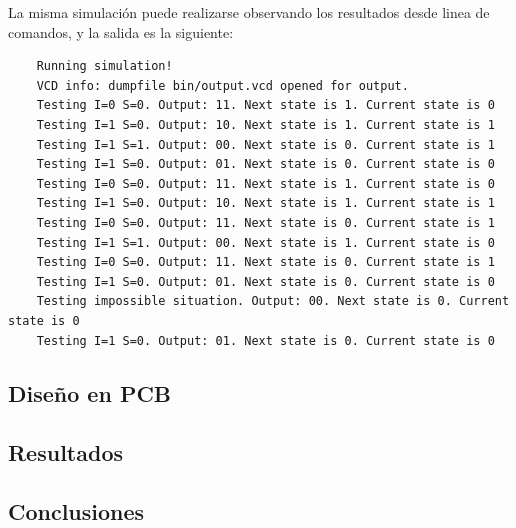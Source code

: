 La misma simulación puede realizarse observando los resultados desde linea de comandos, y la salida es la siguiente:
\begin{lstlisting}
    Running simulation!
    VCD info: dumpfile bin/output.vcd opened for output.
    Testing I=0 S=0. Output: 11. Next state is 1. Current state is 0
    Testing I=1 S=0. Output: 10. Next state is 1. Current state is 1
    Testing I=1 S=1. Output: 00. Next state is 0. Current state is 1
    Testing I=1 S=0. Output: 01. Next state is 0. Current state is 0
    Testing I=0 S=0. Output: 11. Next state is 1. Current state is 0
    Testing I=1 S=0. Output: 10. Next state is 1. Current state is 1
    Testing I=0 S=0. Output: 11. Next state is 0. Current state is 1
    Testing I=1 S=1. Output: 00. Next state is 1. Current state is 0
    Testing I=0 S=0. Output: 11. Next state is 0. Current state is 1
    Testing I=1 S=0. Output: 01. Next state is 0. Current state is 0
    Testing impossible situation. Output: 00. Next state is 0. Current state is 0
    Testing I=1 S=0. Output: 01. Next state is 0. Current state is 0
\end{lstlisting}



\subsection{Diseño en PCB}



\subsection{Resultados}



\subsection{Conclusiones}